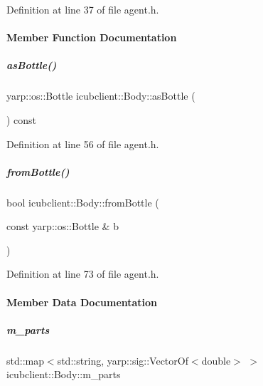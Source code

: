 Definition at line 37 of file agent.\+h.



\paragraph{Member Function Documentation}
\mbox{\label{group__icubclient__representations_af2ba1e2ba63afa934054d0055bd4a61d}} 
\subparagraph{\texorpdfstring{as\+Bottle()}{asBottle()}}
{\footnotesize\ttfamily yarp\+::os\+::\+Bottle icubclient\+::\+Body\+::as\+Bottle (\begin{DoxyParamCaption}{ }\end{DoxyParamCaption}) const\hspace{0.3cm}{\ttfamily [inline]}}



Definition at line 56 of file agent.\+h.

\mbox{\label{group__icubclient__representations_a63aee3af01b5e41f75f0a9d6df43a7ea}} 
\subparagraph{\texorpdfstring{from\+Bottle()}{fromBottle()}}
{\footnotesize\ttfamily bool icubclient\+::\+Body\+::from\+Bottle (\begin{DoxyParamCaption}\item[{const yarp\+::os\+::\+Bottle \&}]{b }\end{DoxyParamCaption})\hspace{0.3cm}{\ttfamily [inline]}}



Definition at line 73 of file agent.\+h.



\paragraph{Member Data Documentation}
\mbox{\label{group__icubclient__representations_ac31e859719f94ca6606132b47bc27421}} 
\subparagraph{\texorpdfstring{m\+\_\+parts}{m\_parts}}
{\footnotesize\ttfamily std\+::map$<$std\+::string, yarp\+::sig\+::\+Vector\+Of$<$double$>$ $>$ icubclient\+::\+Body\+::m\+\_\+parts}



